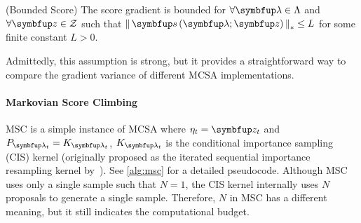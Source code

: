 
\begin{assumption}{(Bounded Score)}\label{thm:bounded_score}
  The score gradient is bounded for \(\forall \vlambda \in \Lambda\) and \(\forall \vz \in \mathcal{Z}\) such that \(\norm{\vs\left(\vlambda; \vz\right)}_* \leq L \) for some finite constant \(L > 0\).
\end{assumption}
\vspace{-0.05in}
Admittedly, this assumption is strong, but it provides a straightforward way to compare the gradient variance of different MCSA implementations.

\vspace{-0.05in}
\paragraph{Markovian Score Climbing}
MSC is a simple instance of MCSA where \(\eta_t = \vz_t\) and \(P_{\vlambda_t} = K_{\vlambda_t}\), \(K_{\vlambda_t}\) is the conditional importance sampling (CIS) kernel (originally proposed as the iterated sequential importance resampling kernel by~\citet{andrieu_uniform_2018}).
See \cref{alg:msc} for a detailed pseudocode.
Although MSC uses only a single sample such that \(N=1\), the CIS kernel internally uses \(N\) proposals to generate a single sample.
Therefore, \(N\) in MSC has a different meaning, but it still indicates the computational budget.




